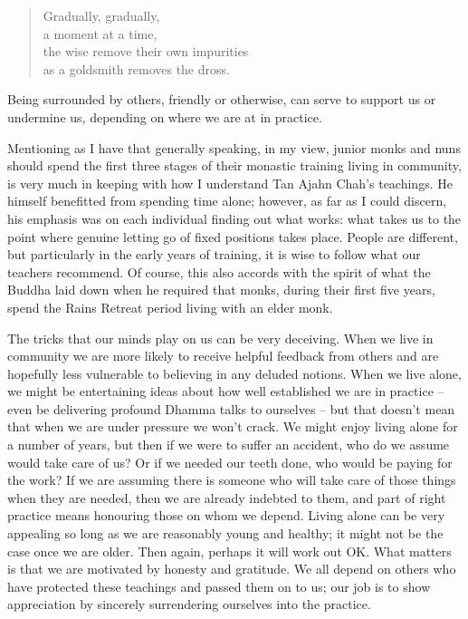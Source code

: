 \clearpage

\begin{quote}
  Gradually, gradually,\\
  a moment at a time,\\
  the wise remove their own impurities\\
  as a goldsmith removes the dross.
\end{quote}

Being surrounded by others, friendly or otherwise, can serve to support
us or undermine us, depending on where we are at in practice.

Mentioning as I have that generally speaking, in my view, junior monks
and nuns should spend the first three stages of their monastic training
living in community, is very much in keeping with how I understand Tan
Ajahn Chah's teachings. He himself benefitted from spending time alone;
however, as far as I could discern, his emphasis was on each individual
finding out what works: what takes us to the point where genuine letting
go of fixed positions takes place. People are different, but
particularly in the early years of training, it is wise to follow what
our teachers recommend. Of course, this also accords with the spirit of
what the Buddha laid down when he required that monks, during their
first five years, spend the Rains Retreat period living with an elder
monk.

The tricks that our minds play on us can be very deceiving. When we live
in community we are more likely to receive helpful feedback from others
and are hopefully less vulnerable to believing in any deluded notions.
When we live alone, we might be entertaining ideas about how well
established we are in practice -- even be delivering profound Dhamma
talks to ourselves -- but that doesn't mean that when we are under
pressure we won't crack. We might enjoy living alone for a number of
years, but then if we were to suffer an accident, who do we assume would
take care of us? Or if we needed our teeth done, who would be paying for
the work? If we are assuming there is someone who will take care of
those things when they are needed, then we are already indebted to them,
and part of right practice means honouring those on whom we depend.
Living alone can be very appealing so long as we are reasonably young
and healthy; it might not be the case once we are older. Then again,
perhaps it will work out OK. What matters is that we are motivated by
honesty and gratitude. We all depend on others who have protected these
teachings and passed them on to us; our job is to show appreciation by
sincerely surrendering ourselves into the practice.

